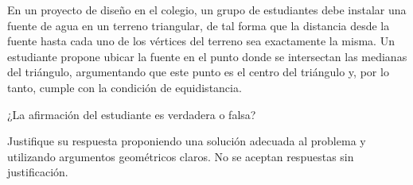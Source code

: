 En un proyecto de diseño en el colegio, un grupo de estudiantes debe instalar una fuente de agua en un terreno triangular, de tal forma que la distancia desde la fuente hasta cada uno de los vértices del terreno sea exactamente la misma. Un estudiante propone ubicar la fuente en el punto donde se intersectan las medianas del triángulo, argumentando que este punto es el centro del triángulo y, por lo tanto, cumple con la condición de equidistancia.

¿La afirmación del estudiante es verdadera o falsa?

Justifique su respuesta proponiendo una solución adecuada al problema y utilizando argumentos geométricos claros. No se aceptan respuestas sin justificación.